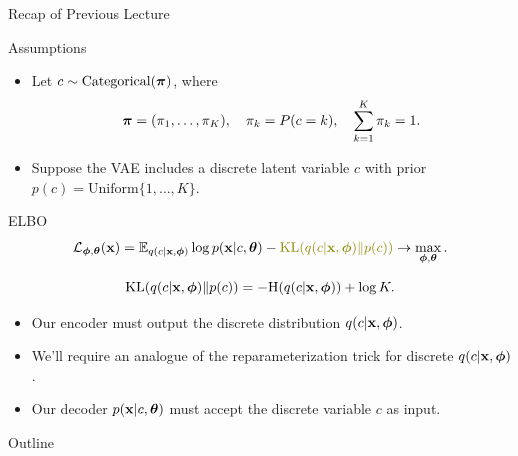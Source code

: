 \documentclass{beamer}
\begin{document}
\begin{frame}{Recap of Previous Lecture}
	\vspace{-0.3cm}
	\begin{block}{Assumptions}
		\begin{itemize}
			\item Let $c \sim \mathrm{Categorical}(\boldsymbol{\pi})$, where 
			\vspace{-0.6cm}
			\[
				\boldsymbol{\pi} = (\pi_1, \dots, \pi_K), \quad \pi_k = P(c = k), \quad \sum_{k=1}^K \pi_k = 1.
			\]
			\vspace{-0.7cm}
			\item Suppose the VAE includes a discrete latent variable $c$ with prior $p(c) = \text{Uniform}\{1, \dots, K\}$.
		\end{itemize}
	\end{block}
	\vspace{-0.3cm}
	\begin{block}{ELBO}
		\vspace{-0.6cm}
		\[
			\cL_{\bphi, \btheta}(\bx)  = \bbE_{q(c | \bx, \bphi)} \log p(\bx | c, \btheta) - {\color{olive} \KL(q(c| \bx, \bphi) \| p(c))} \rightarrow \max_{\bphi, \btheta}.
		\]
	\end{block}
	\vspace{-1.0cm}
	\[
		\mathrm{KL}(q(c| \mathbf{x}, \boldsymbol{\phi}) \| p(c)) = - \mathrm{H}(q(c | \mathbf{x}, \boldsymbol{\phi})) + \log K. 
	\]		
	\vspace{-0.5cm}
	\begin{itemize}
		\item Our encoder must output the discrete distribution $q(c | \mathbf{x}, \boldsymbol{\phi})$.
		\item We'll require an analogue of the reparameterization trick for discrete $q(c | \mathbf{x}, \boldsymbol{\phi})$.
		\item Our decoder $p(\mathbf{x} | c, \boldsymbol{\theta})$ must accept the discrete variable $c$ as input.
	\end{itemize}
\end{frame}
\begin{frame}{Outline}
	\tableofcontents
\end{frame}
\end{document}
